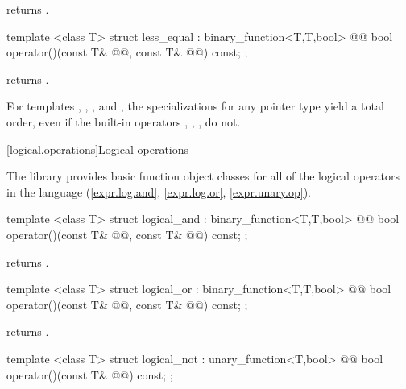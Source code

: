 \documentclass[american,twoside]{book}
\begin{document}
\begin{itemdescr}
\pnum
{} returns .
\end{itemdescr}

%
\begin{itemdecl}
template <class T> struct less_equal : binary_function<T,T,bool> {
  @@
    bool operator()(const T& @@, const T& @@) const;
};
\end{itemdecl}

\begin{itemdescr}
\pnum
{} returns .
\end{itemdescr}

\pnum
For templates , , , and
, the specializations for any pointer type yield a total order,
even if the built-in operators \tcode{<}, \tcode{>}, \tcode{<=}, \tcode{>=}
do not.

[logical.operations]{Logical operations}

\pnum
The library provides basic function object classes for all of the logical
operators in the language (\ref{expr.log.and}, \ref{expr.log.or}, \ref{expr.unary.op}).

%
\begin{itemdecl}
template <class T> struct logical_and : binary_function<T,T,bool> {
  @@
    bool operator()(const T& @@, const T& @@) const;
};
\end{itemdecl}

\begin{itemdescr}
\pnum
{} returns .
\end{itemdescr}

%
\begin{itemdecl}
template <class T> struct logical_or : binary_function<T,T,bool> {
  @@
    bool operator()(const T& @@, const T& @@) const;
};
\end{itemdecl}

\begin{itemdescr}
\pnum
{} returns .
\end{itemdescr}

%
\begin{itemdecl}
template <class T> struct logical_not : unary_function<T,bool> {
  @@
    bool operator()(const T& @@) const;
};
\end{itemdecl}
\end{document}
